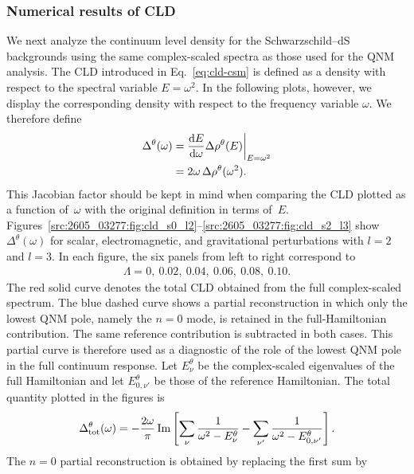 \subsubsection{Numerical results of CLD}
We next analyze the continuum level density for the Schwarzschild--dS
backgrounds using the same complex-scaled spectra as those used for the QNM
analysis.
The CLD introduced in Eq.~\eqref{eq:cld-csm} is defined as a density with
respect to the spectral variable $E=\omega^2$.
In the following plots, however, we display the corresponding density with
respect to the frequency variable $\omega$.
We therefore define
\begin{align}
    \Delta^\theta(\omega)
    &=
    \frac{\mathrm{d} E}{\mathrm{d} \omega}
    \Delta\rho^\theta(E)
    \bigg|_{E=\omega^2}
    \notag\\
    &=
    2\omega\,
    \Delta\rho^\theta(\omega^2).
    \label{src:2605_03277:eq:cld_omega_density}
\end{align}
This Jacobian factor should be kept in mind when comparing the CLD plotted
as a function of~$\omega$ with the original definition in terms of~$E$.
Figures~\ref{src:2605_03277:fig:cld_s0_l2}--\ref{src:2605_03277:fig:cld_s2_l3} show
$\Delta^\theta(\omega)$ for scalar, electromagnetic, and gravitational
perturbations with $l=2$ and $l=3$.
In each figure, the six panels from left to right correspond to
\begin{align}
    \Lambda
    =
    0,\ 0.02,\ 0.04,\ 0.06,\ 0.08,\ 0.10 .
\end{align}
The red solid curve denotes the total CLD obtained from the full
complex-scaled spectrum.
The blue dashed curve shows a partial reconstruction in which only the
lowest QNM pole, namely the $n=0$ mode, is retained in the full-Hamiltonian
contribution.
The same reference contribution is subtracted in both cases.
This partial curve is therefore used as a diagnostic of the role of the
lowest QNM pole in the full continuum response.
Let $E^\theta_\nu$ be the complex-scaled eigenvalues of the full Hamiltonian
and let $E^\theta_{0,\nu'}$ be those of the reference Hamiltonian.
The total quantity plotted in the figures is
\begin{align}
    \Delta^\theta_{\mathrm{tot}}(\omega)
    =
    -\frac{2\omega}{\pi}
    \operatorname{Im}
    \left[
    \sum_\nu
    \frac{1}{\omega^2-E^\theta_\nu}
    -
    \sum_{\nu'}
    \frac{1}{\omega^2-E^\theta_{0,\nu'}}
    \right].
    \label{src:2605_03277:eq:cld_total_omega}
\end{align}
The $n=0$ partial reconstruction is obtained by replacing the first sum by

